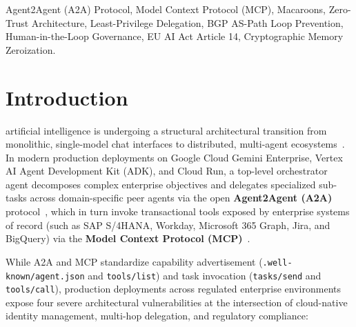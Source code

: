 \documentclass[conference,10pt]{IEEEtran}
\begin{document}
\begin{IEEEkeywords}
Agent2Agent (A2A) Protocol, Model Context Protocol (MCP), Macaroons, Zero-Trust Architecture, Least-Privilege Delegation, BGP AS-Path Loop Prevention, Human-in-the-Loop Governance, EU AI Act Article 14, Cryptographic Memory Zeroization.
\end{IEEEkeywords}

\section{Introduction}
 artificial intelligence is undergoing a structural architectural transition from monolithic, single-model chat interfaces to distributed, multi-agent ecosystems~\cite{gemini2025report, a2a2025spec, anthropic2024mcp, tomasev2026delegation}. In modern production deployments on Google Cloud Gemini Enterprise, Vertex AI Agent Development Kit (ADK), and Cloud Run, a top-level orchestrator agent decomposes complex enterprise objectives and delegates specialized sub-tasks across domain-specific peer agents via the open \textbf{Agent2Agent (A2A)} protocol~\cite{a2a2025spec}, which in turn invoke transactional tools exposed by enterprise systems of record (such as SAP S/4HANA, Workday, Microsoft 365 Graph, Jira, and BigQuery) via the \textbf{Model Context Protocol (MCP)}~\cite{anthropic2024mcp}.

While A2A and MCP standardize capability advertisement (\texttt{.well-known/agent.json} and \texttt{tools/list}) and task invocation (\texttt{tasks/send} and \texttt{tools/call}), production deployments across regulated enterprise environments expose four severe architectural vulnerabilities at the intersection of cloud-native identity management, multi-hop delegation, and regulatory compliance:
\end{document}

